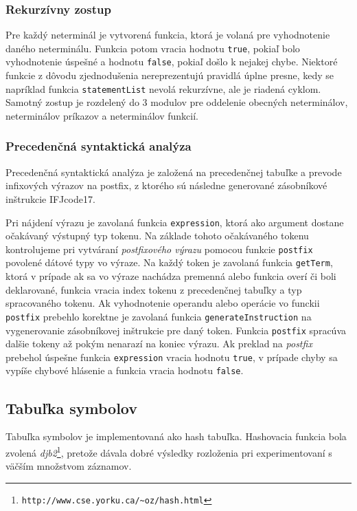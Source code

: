 \documentclass{article}
\begin{document}
            \subsubsection{Rekurzívny zostup}
                Pre každý neterminál je vytvorená funkcia, ktorá je volaná pre vyhodnotenie daného neterminálu.
                Funkcia potom vracia hodnotu \texttt{true}, pokiaľ bolo vyhodnotenie úspešné a hodnotu \texttt{false}, pokiaľ došlo k nejakej chybe. Niektoré funkcie z dôvodu zjednodušenia nereprezentujú pravidlá úplne presne, kedy se napríklad funkcia \texttt{statementList} nevolá rekurzívne, ale je riadená cyklom. Samotný zostup je rozdelený do 3 modulov pre oddelenie obecných neterminálov, neterminálov príkazov a neterminálov funkcií.
            
            \subsubsection{Precedenčná syntaktická analýza}
                Precedenčná syntaktická analýza je založená na precedenčnej tabuľke a prevode infixových výrazov
                na postfix, z ktorého sú následne generované zásobníkové inštrukcie IFJcode17. 

                Pri nájdení výrazu je zavolaná funkcia \texttt{expression}, ktorá ako argument dostane očakávaný
                výstupný typ tokenu. Na základe tohoto očakávaného tokenu kontrolujeme pri vytváraní \emph{postfixového 
                výrazu} pomocou funkcie \texttt{postfix} povolené dátové typy vo výraze. Na každý token je zavolaná 
                funkcia \texttt{getTerm}, ktorá v prípade ak sa vo výraze nachádza premenná alebo funkcia overí či 
                boli deklarované, funkcia vracia index tokenu z precedenčnej tabuľky a typ spracovaného tokenu. Ak 
                vyhodnotenie operandu alebo operácie vo funckii \texttt{postfix} prebehlo korektne je zavolaná funkcia 
                \texttt{generateInstruction} na vygenerovanie zásobníkovej inštrukcie pre daný token. Funkcia 
                \texttt{postfix} spracúva dalšie tokeny až pokým nenarazí na koniec výrazu. Ak preklad na \emph{postfix}
                prebehol úspešne funkcia \texttt{expression} vracia hodnotu \texttt{true}, v prípade chyby sa vypíše chybové
                hlásenie a funkcia vracia hodnotu \texttt{false}.
    
        \subsection{Tabuľka symbolov}
            Tabuľka symbolov je implementovaná ako hash tabuľka. Hashovacia funkcia bola zvolená \emph{djb2}\footnote{\texttt{http://www.cse.yorku.ca/\~{}oz/hash.html}}, pretože dávala dobré výsledky rozloženia pri experimentovaní s väčším množstvom záznamov.
            
\end{document}
